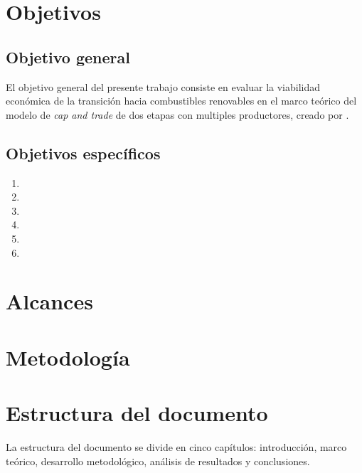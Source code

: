 \section{Objetivos}
\subsection{Objetivo general}
El objetivo general del presente trabajo consiste en evaluar la viabilidad económica de la transición hacia combustibles renovables en el marco teórico del modelo de \textit{cap and trade} de dos etapas con multiples productores, creado por .\\

\subsection{Objetivos específicos}

\begin{enumerate}
\item 
\item 
\item 
\item 
\item 
\item 
\end{enumerate}


\section{Alcances}




\section{Metodología}



\newpage
\section{Estructura del documento}

La estructura del documento se divide en cinco capítulos: introducción, marco teórico, desarrollo metodológico, análisis de resultados y conclusiones.


